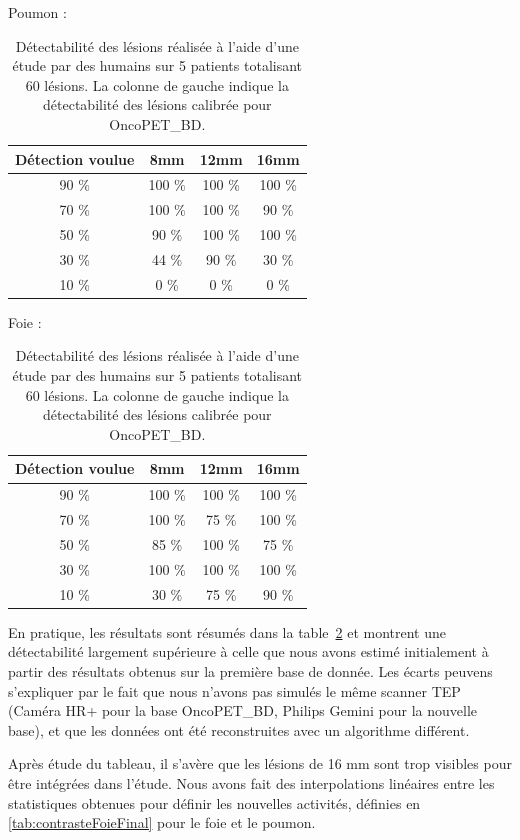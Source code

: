 \begin{table}
\centering
Poumon :\\
\begin{tabular}{|c|c|c|c|}
 \hline
 Détection voulue & 	8mm & 	12mm & 	16mm \\
\hline
90 \%		  & 100 \%  & 100 \% & 100 \% \\
\hline
70 \%		  & 100 \%  & 100 \% & 90 \%\\
\hline
50 \%		  & 90 \%  & 100 \% & 100 \%\\
\hline
30 \%		  & 44 \%  & 90 \% & 30 \%\\
\hline
10 \% 		  & 0 \%  & 0 \% & 0 \%\\
\hline
\end{tabular}

\vspace{0.5cm}

Foie :\\
\begin{tabular}{|c|c|c|c|}
 \hline
 Détection voulue & 	8mm & 	12mm & 	16mm \\
\hline
90 \%		  & 100 \%  & 100 \% & 100 \% \\
\hline
70 \%		  & 100 \%  & 75 \% & 100 \%\\
\hline
50 \%		  & 85 \%  & 100 \% & 75 \%\\
\hline
30 \%		  & 100 \%  & 100 \% & 100 \%\\
\hline
10 \% 		  & 30 \%  & 75 \% & 90 \%\\
\hline
\end{tabular}
\caption[Détectabilité estimée des lésions en fonction du contraste et de leur diamètre]{Détectabilité des lésions réalisée à l'aide d'une étude par des humains sur 5 patients totalisant 60 lésions. La colonne de gauche indique la détectabilité des lésions calibrée pour OncoPET\_BD.}
\label{fig:detectabiliteVue}
\end{table}

En pratique, les résultats sont résumés dans la table~\ref{fig:detectabiliteVue} et montrent une détectabilité largement supérieure à celle que nous avons estimé initialement à partir des résultats obtenus sur la première base de donnée. Les écarts peuvens s'expliquer par le fait que nous n'avons pas simulés le même scanner TEP (Caméra HR+ pour la base OncoPET\_BD, Philips Gemini pour la nouvelle base), et que les données ont été reconstruites avec un algorithme différent.

Après étude du tableau, il s'avère que les lésions de 16 mm sont trop visibles pour être intégrées dans l'étude. Nous avons fait des interpolations linéaires entre les statistiques obtenues pour définir les nouvelles activités, définies en \ref{tab:contrasteFoieFinal} pour le foie et le poumon.



